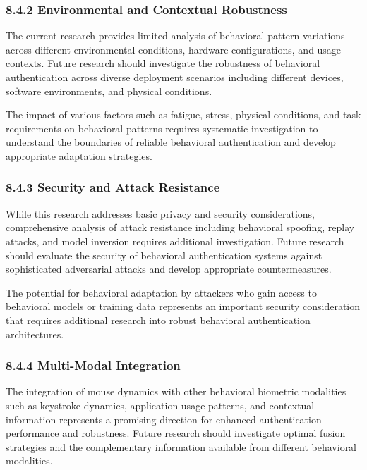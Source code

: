 \documentclass[
  11pt,
  a4paper,
]{article}
\begin{document}
\subsubsection{8.4.2 Environmental and Contextual
Robustness}\label{environmental-and-contextual-robustness}

The current research provides limited analysis of behavioral pattern
variations across different environmental conditions, hardware
configurations, and usage contexts. Future research should investigate
the robustness of behavioral authentication across diverse deployment
scenarios including different devices, software environments, and
physical conditions.

The impact of various factors such as fatigue, stress, physical
conditions, and task requirements on behavioral patterns requires
systematic investigation to understand the boundaries of reliable
behavioral authentication and develop appropriate adaptation strategies.

\subsubsection{8.4.3 Security and Attack
Resistance}\label{security-and-attack-resistance}

While this research addresses basic privacy and security considerations,
comprehensive analysis of attack resistance including behavioral
spoofing, replay attacks, and model inversion requires additional
investigation. Future research should evaluate the security of
behavioral authentication systems against sophisticated adversarial
attacks and develop appropriate countermeasures.

The potential for behavioral adaptation by attackers who gain access to
behavioral models or training data represents an important security
consideration that requires additional research into robust behavioral
authentication architectures.

\subsubsection{8.4.4 Multi-Modal
Integration}\label{multi-modal-integration-1}

The integration of mouse dynamics with other behavioral biometric
modalities such as keystroke dynamics, application usage patterns, and
contextual information represents a promising direction for enhanced
authentication performance and robustness. Future research should
investigate optimal fusion strategies and the complementary information
available from different behavioral modalities.
\end{document}
